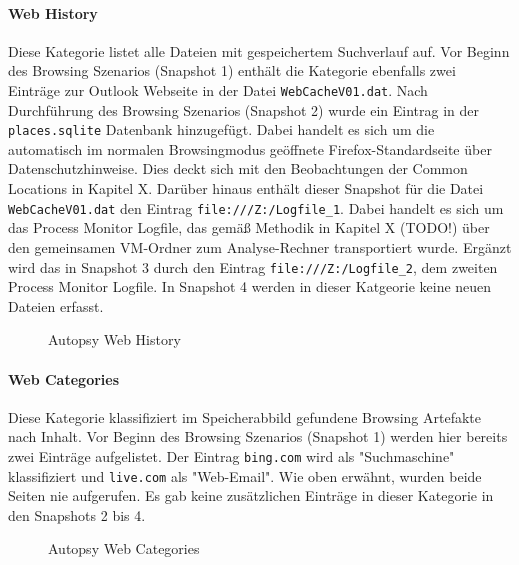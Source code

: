 \begin{appendices}
\paragraph*{Web History}
Diese Kategorie listet alle Dateien mit gespeichertem Suchverlauf auf. Vor Beginn des Browsing Szenarios (Snapshot 1) enthält die Kategorie ebenfalls zwei Einträge zur Outlook Webseite in der Datei \texttt{WebCacheV01.dat}. Nach Durchführung des Browsing Szenarios (Snapshot 2) wurde ein Eintrag in der \texttt{places.sqlite} Datenbank hinzugefügt. Dabei handelt es sich um die automatisch im normalen Browsingmodus geöffnete Firefox-Standardseite über Datenschutzhinweise. Dies deckt sich mit den Beobachtungen der Common Locations in Kapitel X. Darüber hinaus enthält dieser Snapshot für die Datei \texttt{WebCacheV01.dat} den Eintrag \texttt{file:///Z:/Logfile\_1}. Dabei handelt es sich um das Process Monitor Logfile, das gemäß Methodik in Kapitel X (TODO!) über den gemeinsamen VM-Ordner zum Analyse-Rechner transportiert wurde. Ergänzt wird das in Snapshot 3 durch den Eintrag \texttt{file:///Z:/Logfile\_2}, dem zweiten Process Monitor Logfile. In Snapshot 4 werden in dieser Katgeorie keine neuen Dateien erfasst.
\begin{figure}[h!]
	\centerline{}
	\label{chart:final-criteria}  
	\caption{Autopsy Web History}
\end{figure}

\paragraph*{Web Categories}
Diese Kategorie klassifiziert im Speicherabbild gefundene Browsing Artefakte nach Inhalt.
Vor Beginn des Browsing Szenarios (Snapshot 1) werden hier bereits zwei Einträge aufgelistet. Der Eintrag \texttt{bing.com} wird als "Suchmaschine" klassifiziert und \texttt{live.com} als "Web-Email".
Wie oben erwähnt, wurden beide Seiten nie aufgerufen. Es gab keine zusätzlichen Einträge in dieser Kategorie in den Snapshots 2 bis 4.
\begin{figure}[h!]
	\centerline{}
	\label{chart:final-criteria}  
	\caption{Autopsy Web Categories}
\end{figure}
		


\end{appendices}
